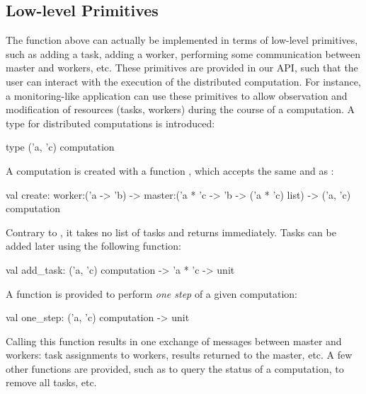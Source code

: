 \documentclass{llncs}
\newcommand{\Ocaml}{OCaml}
\begin{document}
\begin{comment}
When master and worker programs are compiled with different
versions of the \Ocaml\ compiler, our library still provides
a monomorphic API over strings. As a consequence, we need to convert
integers to and from strings in both master and worker.
The modified worker program is as follows:
\begin{ocaml}
  open Mono
  let worker i = ...
  let worker_string i = string_of_int (worker (int_of_string i))
  let () = Worker.compute worker_string ()
\end{ocaml}
The master program is modified in a similar way.
We simply replace \of{Poly} with \of{Mono} and encode/decode integers
as strings, as follows:
\begin{ocaml}
  let tasks = 
    let l = ref [] in 
    for i = 0 to n do l := (string_of_int i, ()) :: !l done; 
    !l
  let master (i,()) fi = s := !s + int_of_string fi; []
\end{ocaml}
\end{comment}

\subsection{Low-level Primitives}


The function  above can actually be implemented in terms
of low-level primitives, such as adding a task, adding a worker,
performing some communication between master and workers, etc.
These primitives are provided in our API, such that the user can
interact with the execution of the distributed computation.  For
instance, a monitoring-like application can use these primitives to
allow observation and modification of resources (tasks, workers)
during the course of a computation.
A type for distributed computations is introduced:
\begin{ocaml}
  type ('a, 'c) computation
\end{ocaml}
A computation is created with a function , which accepts
the same  and  as :
\begin{ocaml}
  val create: worker:('a -> 'b) -> 
    master:('a * 'c -> 'b -> ('a * 'c) list) -> ('a, 'c) computation
\end{ocaml}
Contrary to , it takes no list of tasks and returns
immediately. Tasks can be added later using the following function:
\begin{ocaml}
  val add_task: ('a, 'c) computation -> 'a * 'c -> unit
\end{ocaml}
A function is provided to perform \emph{one step} of a given
computation:
\begin{ocaml}
  val one_step: ('a, 'c) computation -> unit
\end{ocaml}
Calling this function results in one exchange of messages between
master and workers: task assignments to workers, results returned to
the master, etc. A few other functions are provided, such as
 to query the status of a computation,  to remove
all tasks, etc.
\end{document}
